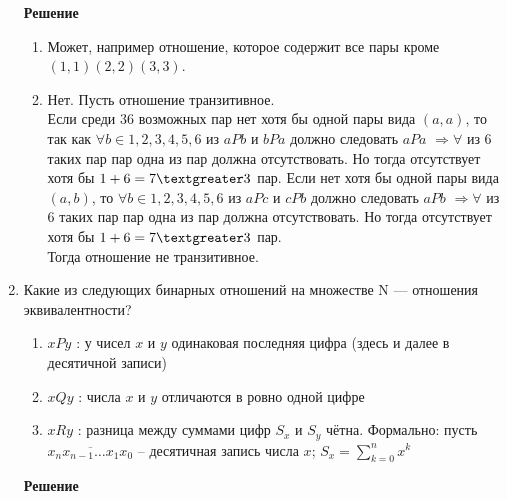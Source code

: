 \documentclass[12pt]{article}
\begin{document}
\begin{enumerate}[label={\textbf{\arabic{section}.\arabic*}}]
		\textbf{Решение}
		
		\begin{enumerate}[label=\textbf{\alph*)}]
			\item Может, например отношение, которое содержит все пары кроме $(1,1)(2,2)(3,3)$.
			\item Нет. Пусть отношение транзитивное.\\
			Если среди $36$ возможных пар нет хотя бы одной пары вида $(a,a)$, то так как $\forall b \in {1,2,3,4,5,6}$ из $aPb$ и $bPa$ должно следовать $aPa$ $\Rightarrow \forall$ из $6$ таких пар пар одна из пар должна отсутствовать. Но тогда отсутствует хотя бы $1+6 = 7 \textgreater 3$ пар.
			Если нет хотя бы одной пары вида $(a,b)$, то $\forall b \in {1,2,3,4,5,6}$ из $aPc$ и $cPb$  должно следовать $aPb$ $\Rightarrow \forall$ из $6$ таких пар пар одна из пар должна отсутствовать. Но тогда отсутствует хотя бы $1+6 = 7 \textgreater 3$ пар.\\
			Тогда отношение не транзитивное.
		\end{enumerate}
	
		\item Какие из следующих бинарных отношений на множестве N — отношения эквивалентности?
		\begin{enumerate}[label=\textbf{\alph*)}]
			\item $xPy$ : $у$ чисел $x$ и $y$ одинаковая последняя цифра (здесь и далее в десятичной записи)
			\item $xQy$ : числа $x$ и $y$ отличаются в ровно одной цифре
			\item $xRy$ : разница между суммами цифр $S_x$ и $S_y$ чётна. Формально: пусть $\overline{x_nx_{n-1}\dots x_1x_0}$ -- десятичная запись числа $x$; $S_x = \sum\limits_{k = 0}^n x^k$
		\end{enumerate}
		
		\textbf{Решение}
		

\end{enumerate}
\end{document}
